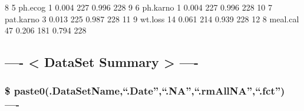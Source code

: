 \documentclass[
]{article}
\newenvironment{Shaded}{\begin{snugshade}}{\end{snugshade}}
\newcommand{\DecValTok}[1]{\textcolor[rgb]{0.00,0.00,0.81}{#1}}
\newcommand{\FloatTok}[1]{\textcolor[rgb]{0.00,0.00,0.81}{#1}}
\newcommand{\NormalTok}[1]{#1}
\begin{document}
\begin{Shaded}
\begin{Highlighting}[]
\DecValTok{8}       \DecValTok{5}\NormalTok{         ph.ecog    }\DecValTok{1}     \FloatTok{0.004}   \DecValTok{227}      \FloatTok{0.996}  \DecValTok{228}
\DecValTok{9}       \DecValTok{6}\NormalTok{        ph.karno    }\DecValTok{1}     \FloatTok{0.004}   \DecValTok{227}      \FloatTok{0.996}  \DecValTok{228}
\DecValTok{10}      \DecValTok{7}\NormalTok{       pat.karno    }\DecValTok{3}     \FloatTok{0.013}   \DecValTok{225}      \FloatTok{0.987}  \DecValTok{228}
\DecValTok{11}      \DecValTok{9}\NormalTok{         wt.loss   }\DecValTok{14}     \FloatTok{0.061}   \DecValTok{214}      \FloatTok{0.939}  \DecValTok{228}
\DecValTok{12}      \DecValTok{8}\NormalTok{        meal.cal   }\DecValTok{47}     \FloatTok{0.206}   \DecValTok{181}      \FloatTok{0.794}  \DecValTok{228}
\end{Highlighting}
\end{Shaded}

\hypertarget{dataset-summary--}{%
\subsection{---- \textless{} DataSet Summary \textgreater{}
----}\label{dataset-summary--}}

\hypertarget{paste0.datasetname.date.na.rmallna.fct--}{%
\subsubsection{\$
paste0(.DataSetName,``.Date'',``.NA'',``.rmAllNA'',``.fct'')
----}\label{paste0.datasetname.date.na.rmallna.fct--}}
\end{document}
